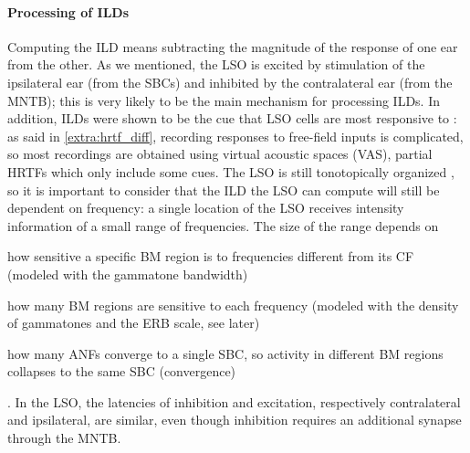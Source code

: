 \documentclass[11pt,a4paper]{article}
\begin{document}
\paragraph{Processing of ILDs}
Computing the ILD means subtracting the magnitude of the response of one ear from the other. As we mentioned, the LSO is excited by stimulation of the ipsilateral ear (from the SBCs) and inhibited by the contralateral ear (from the MNTB); this is very likely to be the main mechanism for processing ILDs. In addition, ILDs were shown to be the cue that LSO cells are most responsive to \cite{tollinCodingSpatialLocation2002}: as said in \ref{extra:hrtf_diff}, recording responses to free-field inputs is complicated, so most recordings are obtained using virtual acoustic spaces (VAS), partial HRTFs which only include some cues. The LSO is still tonotopically organized \cite{tsuchitaniFunctionalOrganizationLateral1977a}, so it is important to consider that the ILD the LSO can compute will still be dependent on frequency: a single location of the LSO receives intensity information of a small range of frequencies. The size of the range depends on 
\begin{inlinelist}
    \item how sensitive a specific BM region is to frequencies different from its CF (modeled with the gammatone bandwidth)
    \item how many BM regions are sensitive to each frequency (modeled with the density of gammatones and the ERB scale, see later)
    \item how many ANFs converge to a single SBC, so activity in different BM regions collapses to the same SBC (convergence) 
\end{inlinelist}. In the LSO, the latencies of inhibition and excitation, respectively contralateral and ipsilateral, are similar, even though inhibition requires an additional synapse through the MNTB.
\end{document}
